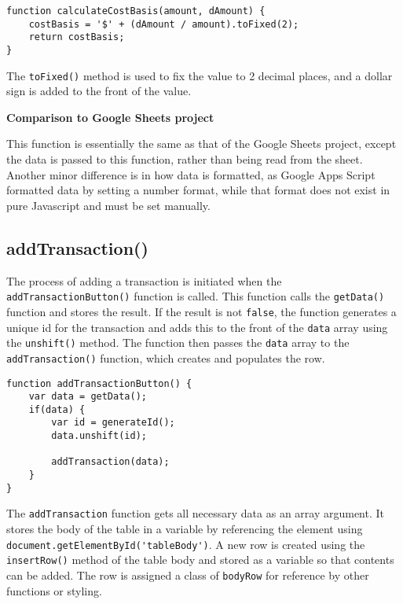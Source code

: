 \documentclass[letterpaper]{article}
\begin{document}
\begin{lstlisting}[firstnumber=134]
function calculateCostBasis(amount, dAmount) {
    costBasis = '$' + (dAmount / amount).toFixed(2);
    return costBasis;
}
\end{lstlisting}

The \lstinline{toFixed()} method is used to fix the value to 2 decimal places, and a dollar sign is added to the front of the value.

\textbf{Comparison to Google Sheets project}

This function is essentially the same as that of the Google Sheets project, except the data is passed to this function, rather than being read from the sheet.
Another minor difference is in how data is formatted, as Google Apps Script formatted data by setting a number format, while that format does not exist in pure Javascript and must be set manually.

\subsection{addTransaction()}

The process of adding a transaction is initiated when the \lstinline{addTransactionButton()} function is called.
This function calls the \lstinline{getData()} function and stores the result.
If the result is not \lstinline{false}, the function generates a unique id for the transaction and adds this to the front of the \lstinline{data} array using the \lstinline{unshift()} method.
The function then passes the \lstinline{data} array to the \lstinline{addTransaction()} function, which creates and populates the row.

\begin{lstlisting}[firstnumber=156]
function addTransactionButton() {
    var data = getData();
    if(data) {
        var id = generateId();
        data.unshift(id);

        addTransaction(data);
    }
}
\end{lstlisting}

The \lstinline{addTransaction} function gets all necessary data as an array argument.
It stores the body of the table in a variable by referencing the element using \lstinline{document.getElementById('tableBody')}.
A new row is created using the \lstinline{insertRow()} method of the table body and stored as a variable so that contents can be added.
The row is assigned a class of \lstinline{bodyRow} for reference by other functions or styling.
\end{document}

